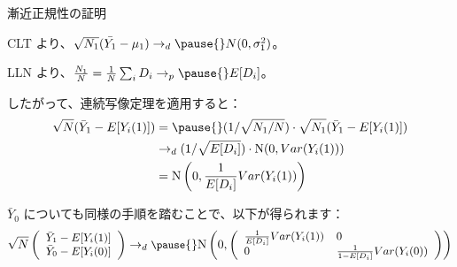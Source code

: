 \documentclass[11pt,handout]{beamer}
\newenvironment{wideitemize}{\itemize\addtolength{\itemsep}{10pt}}{\enditemize}
\begin{document}
\begin{frame}{漸近正規性の証明}

\begin{wideitemize}
\item
CLT より、$\sqrt{N_1} (\bar{Y_1} - \mu_1) \rightarrow_d \pause{} N(0,\sigma_1^2)$。 \pause
	
\item
LLN より、$\frac{N_1}{N} = \frac{1}{N} \sum_i D_i \rightarrow_p \pause{} E[D_i]$。

\pause
\item
したがって、連続写像定理を適用すると：
\begin{align*}
\sqrt{N}(\bar{Y}_1 - E[Y_i(1)]) &= \pause{} (1/\sqrt{N_1/N}) \cdot \sqrt{N_1} (\bar{Y}_1 - E[Y_i(1)])\\ 
&\rightarrow_d (1/\sqrt{E[D_i]}) \cdot \mathrm{N}(0,Var(Y_i(1))) \\
& = \mathrm{N}\left(0, \frac{1}{E[D_i]} Var(Y_i(1)) \right)
\end{align*}

\pause
\item
$\bar{Y}_0$ についても同様の手順を踏むことで、以下が得られます： \pause
	$$\small \sqrt{N} \left(   \begin{array}{c}  \bar{Y}_1 - E[Y_i(1)] \\ 
	  \bar{Y}_0 - E[Y_i(0)] 
\end{array}  \right) \rightarrow_d \pause{} \mathrm{N}\left(0 , \left(\begin{array}{ll} \frac{1}{E[D_i]} Var(Y_i(1)) & 0 \\ 0 & \frac{1}{1-E[D_i]} Var(Y_i(0)) \end{array} \right) \right)$$

\end{wideitemize}
\end{frame}
\end{document}
